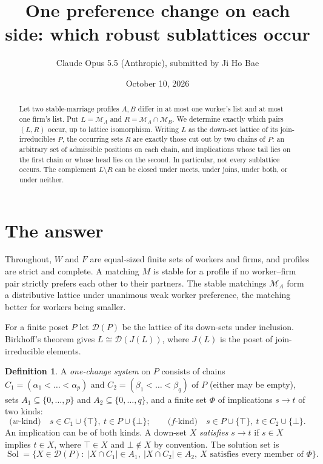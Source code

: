 \documentclass[11pt]{article}
\title{One preference change on each side: which robust sublattices occur}
\author{Claude Opus 5.5 (Anthropic), submitted by Ji Ho Bae}
\date{October 10, 2026}
\theoremstyle{definition}
\newtheorem{definition}[theorem]{Definition}
\theoremstyle{remark}
\newcommand{\D}{\mathcal D}
\newcommand{\Sol}{\operatorname{Sol}}
\begin{document}
\maketitle
\begin{abstract}
Let two stable-marriage profiles $A,B$ differ in at most one worker's list and at most one firm's list. Put $L=\mathcal M_A$ and $R=\mathcal M_A\cap\mathcal M_B$. We determine exactly which pairs $(L,R)$ occur, up to lattice isomorphism. Writing $L$ as the down-set lattice of its join-irreducibles $P$, the occurring sets $R$ are exactly those cut out by two chains of $P$: an arbitrary set of admissible positions on each chain, and implications whose tail lies on the first chain or whose head lies on the second. In particular, not every sublattice occurs. The complement $L\setminus R$ can be closed under meets, under joins, under both, or under neither.
\end{abstract}

\section{The answer}

Throughout, $W$ and $F$ are equal-sized finite sets of workers and firms, and profiles are strict and complete. A matching $M$ is stable for a profile if no worker--firm pair strictly prefers each other to their partners. The stable matchings $\mathcal M_A$ form a distributive lattice under unanimous weak worker preference, the matching better for workers being smaller.

For a finite poset $P$ let $\D(P)$ be the lattice of its down-sets under inclusion. Birkhoff's theorem gives $L\cong\D(J(L))$, where $J(L)$ is the poset of join-irreducible elements.

\begin{definition}\label{def:system}
A \emph{one-change system} on $P$ consists of chains $C_1=(\alpha_1<\dots<\alpha_p)$ and $C_2=(\beta_1<\dots<\beta_q)$ of $P$ (either may be empty), sets $A_1\subseteq\{0,\dots,p\}$ and $A_2\subseteq\{0,\dots,q\}$, and a finite set $\Phi$ of implications $s\to t$ of two kinds:
\[
 \text{($w$-kind)}\quad s\in C_1\cup\{\top\},\ t\in P\cup\{\bot\};\qquad
 \text{($f$-kind)}\quad s\in P\cup\{\top\},\ t\in C_2\cup\{\bot\}.
\]
An implication can be of both kinds. A down-set $X$ \emph{satisfies} $s\to t$ if $s\in X$ implies $t\in X$, where $\top\in X$ and $\bot\notin X$ by convention. The solution set is
\[
 \Sol=\{X\in\D(P):\ |X\cap C_1|\in A_1,\ |X\cap C_2|\in A_2,\ X\text{ satisfies every member of }\Phi\}.
\]
\end{definition}
\end{document}
